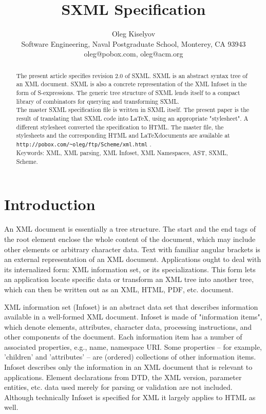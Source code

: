 \documentclass[10pt]{article}
\begin{document}
\title{SXML Specification}
\author{Oleg Kiselyov\\Software Engineering, Naval Postgraduate School, Monterey, CA 93943\\oleg@pobox.com, oleg@acm.org}
\maketitle
\begin{abstract}
The present article specifies revision 2.0 of SXML. SXML is an abstract syntax tree of an XML document. SXML is also
a concrete representation of the XML Infoset in the form of
S-expressions. The generic tree structure of SXML lends itself to a
compact library of combinators for querying and transforming SXML.\\The master SXML specification file is written in SXML itself. The present paper is the result of translating that SXML code into \LaTeX, using an appropriate "stylesheet". A different stylesheet converted the specification to HTML. The master file, the stylesheets and the corresponding HTML and \LaTeX documents are available at  \texttt{http://pobox.com/\textasciitilde{}oleg/ftp/Scheme/xml.html} .\\Keywords: XML, XML parsing, XML Infoset, XML Namespaces, AST, SXML, Scheme.\end{abstract}
\section{Introduction}
An XML document is essentially a tree structure. The start and the end
tags of the root element enclose the whole content of the document,
which may include other elements or arbitrary character data.  Text
with familiar angular brackets is an external representation of an XML
document. Applications ought to deal with its internalized form:
XML information set, or its specializations.  This form lets an
application locate specific data or transform an XML tree into another
tree, which can then be written out as an XML, HTML, PDF, etc.
document.

XML information set (Infoset) \cite{XML Infoset} is an
abstract data set that describes information available in a
well-formed XML document.  Infoset is made of "information items",
which denote elements, attributes, character data, processing
instructions, and other components of the document. Each information
item has a number of associated properties, e.g., name, namespace
URI. Some properties -- for example, 'children' and 'attributes' --
are (ordered) collections of other information items. Infoset describes
only the information in an XML document that is relevant to
applications. Element declarations from DTD, the XML version, parameter
entities, etc. data used merely for parsing or validation are not
included. Although technically Infoset is specified for XML it
largely applies to HTML as well.
\end{document}

